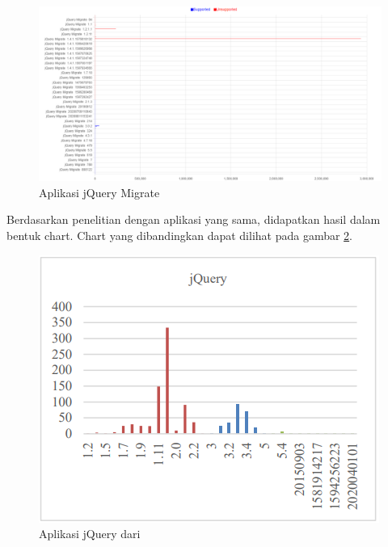 \begin{figure}[H]
	\centering  
	\includegraphics[scale=0.5]{Gambar/hasil_chart_jQuery_migrate.png}  
	\caption{Aplikasi jQuery Migrate} 
	\label{fig:data_sample_jQuery_migrate} 
\end{figure}

Berdasarkan penelitian dengan aplikasi yang sama, didapatkan hasil dalam bentuk chart. Chart yang dibandingkan dapat dilihat pada gambar \ref{fig:data_sample_jQuery_p}.

\begin{figure}[H]
	\centering  
	\includegraphics[scale=0.7]{Gambar/chart_pascal_jQuery.PNG}  
	\caption{Aplikasi jQuery dari \cite{pascal}} 
	\label{fig:data_sample_jQuery_p} 
\end{figure}